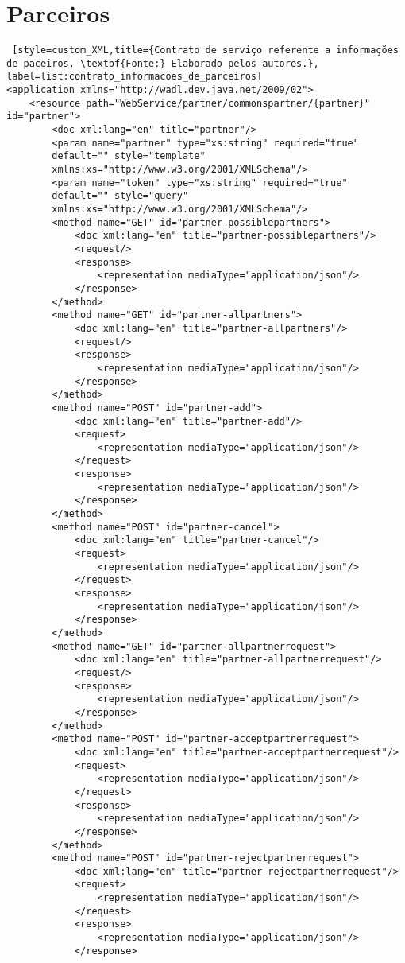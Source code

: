 \section*{Parceiros}

\begin{lstlisting} [style=custom_XML,title={Contrato de serviço referente a informações de paceiros. \textbf{Fonte:} Elaborado pelos autores.}, label=list:contrato_informacoes_de_parceiros] 	
<application xmlns="http://wadl.dev.java.net/2009/02">
	<resource path="WebService/partner/commonspartner/{partner}" id="partner">
		<doc xml:lang="en" title="partner"/>
		<param name="partner" type="xs:string" required="true" 
		default="" style="template" 
		xmlns:xs="http://www.w3.org/2001/XMLSchema"/>
		<param name="token" type="xs:string" required="true" 
		default="" style="query" 
		xmlns:xs="http://www.w3.org/2001/XMLSchema"/>
		<method name="GET" id="partner-possiblepartners">
			<doc xml:lang="en" title="partner-possiblepartners"/>
			<request/>
			<response>
				<representation mediaType="application/json"/>
			</response>
		</method>
		<method name="GET" id="partner-allpartners">
			<doc xml:lang="en" title="partner-allpartners"/>
			<request/>
			<response>
				<representation mediaType="application/json"/>
			</response>
		</method>
		<method name="POST" id="partner-add">
			<doc xml:lang="en" title="partner-add"/>
			<request>
				<representation mediaType="application/json"/>
			</request>
			<response>
				<representation mediaType="application/json"/>
			</response>
		</method>
		<method name="POST" id="partner-cancel">
			<doc xml:lang="en" title="partner-cancel"/>
			<request>
				<representation mediaType="application/json"/>
			</request>
			<response>
				<representation mediaType="application/json"/>
			</response>
		</method>
		<method name="GET" id="partner-allpartnerrequest">
			<doc xml:lang="en" title="partner-allpartnerrequest"/>
			<request/>
			<response>
				<representation mediaType="application/json"/>
			</response>
		</method>
		<method name="POST" id="partner-acceptpartnerrequest">
			<doc xml:lang="en" title="partner-acceptpartnerrequest"/>
			<request>
				<representation mediaType="application/json"/>
			</request>
			<response>
				<representation mediaType="application/json"/>
			</response>
		</method>
		<method name="POST" id="partner-rejectpartnerrequest">
			<doc xml:lang="en" title="partner-rejectpartnerrequest"/>
			<request>
				<representation mediaType="application/json"/>
			</request>
			<response>
				<representation mediaType="application/json"/>
			</response>

\end{lstlisting}
